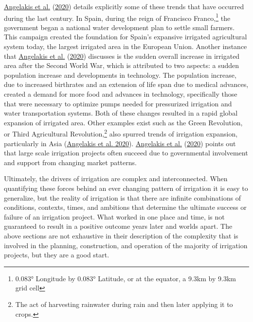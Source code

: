 \documentclass[12pt,twoside]{reedthesis}
\begin{document}
\protect\hyperlink{ref-angelakisIrrigationWorldAgricultural2020}{Angelakis et al.} (\protect\hyperlink{ref-angelakisIrrigationWorldAgricultural2020}{2020}) details explicitly some of these trends that have occurred during the last century. In Spain, during the reign of Francisco Franco,\footnote{0.083° Longitude by 0.083° Latitude, or at the equator, a 9.3km by 9.3km grid cell} the government began a national water development plan to settle small farmers. This campaign created the foundation for Spain's expansive irrigated agricultural system today, the largest irrigated area in the European Union. Another instance that \protect\hyperlink{ref-angelakisIrrigationWorldAgricultural2020}{Angelakis et al.} (\protect\hyperlink{ref-angelakisIrrigationWorldAgricultural2020}{2020}) discusses is the sudden overall increase in irrigated area after the Second World War, which is attributed to two aspects: a sudden population increase and developments in technology. The population increase, due to increased birthrates and an extension of life span due to medical advances, created a demand for more food and advances in technology, specifically those that were necessary to optimize pumps needed for pressurized irrigation and water transportation systems. Both of these changes resulted in a rapid global expansion of irrigated area. Other examples exist such as the Green Revolution, or Third Agricultural Revolution,\footnote{The act of harvesting rainwater during rain and then later applying it to crops.} also spurred trends of irrigation expansion, particularly in Asia (\protect\hyperlink{ref-angelakisIrrigationWorldAgricultural2020}{Angelakis et al. 2020}). \protect\hyperlink{ref-angelakisIrrigationWorldAgricultural2020}{Angelakis et al.} (\protect\hyperlink{ref-angelakisIrrigationWorldAgricultural2020}{2020}) points out that large scale irrigation projects often succeed due to governmental involvement and support from changing market patterns.

\bigskip

Ultimately, the drivers of irrigation are complex and interconnected. When quantifying these forces behind an ever changing pattern of irrigation it is easy to generalize, but the reality of irrigation is that there are infinite combinations of conditions, contexts, times, and ambitions that determine the ultimate success or failure of an irrigation project. What worked in one place and time, is not guaranteed to result in a positive outcome years later and worlds apart. The above sections are not exhaustive in their description of the complexity that is involved in the planning, construction, and operation of the majority of irrigation projects, but they are a good start.
\end{document}
